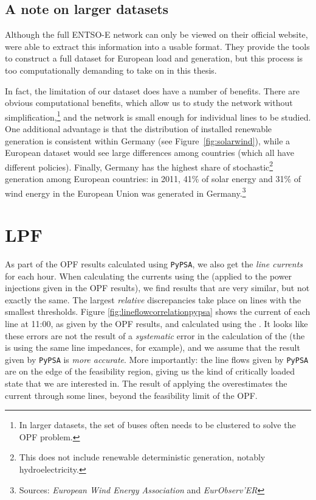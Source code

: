 \documentclass[main.tex]{subfiles}
\begin{document}
\subsection{A note on larger datasets}
Although the full ENTSO-E network can only be viewed on their official website, \cite{PyPSAEUR} were able to extract this information into a usable format. They provide the tools to construct a full dataset for European load and generation, but this process is too computationally demanding to take on in this thesis. 

In fact, the limitation of our dataset does have a number of benefits. There are obvious computational benefits, which allow us to study the network without simplification,\footnote{In larger datasets, the set of buses often needs to be clustered to solve the OPF problem.} and the network is small enough for individual lines to be studied. One additional advantage is that the distribution of installed renewable generation is consistent within Germany (see Figure~\ref{fig:solarwind}), while a European dataset would see large differences among countries (which all have different policies). Finally, Germany has the highest share of stochastic\footnote{This does not include renewable deterministic generation, notably hydroelectricity.} generation among European countries: in 2011, 41\% of solar energy and 31\% of wind energy in the European Union was generated in Germany.\footnote{Sources: \emph{European Wind Energy Association} and \emph{EurObserv’ER}}

\section{LPF}
As part of the OPF results calculated using \texttt{PyPSA}, we also get the \emph{line currents} for each hour. When calculating the currents using the \LPF (applied to the power injections given in the OPF results), we find results that are very similar, but not exactly the same. The largest \emph{relative} discrepancies take place on lines with the smallest thresholds. Figure \ref{fig:lineflowcorrelationpypsa} shows the current of each line at 11:00, as given by the OPF results, and calculated using the \LPF. It looks like these errors are not the result of a \textit{systematic} error in the calculation of the \LPF (the \LPF is using the same line impedances, for example), and we assume that the result given by \texttt{PyPSA} is \emph{more accurate}. More importantly: the line flows given by \texttt{PyPSA} are on the edge of the feasibility region, giving us the kind of critically loaded state that we are interested in. The result of applying the \LPF overestimates the current through some lines, beyond the feasibility limit of the OPF.
\end{document}
